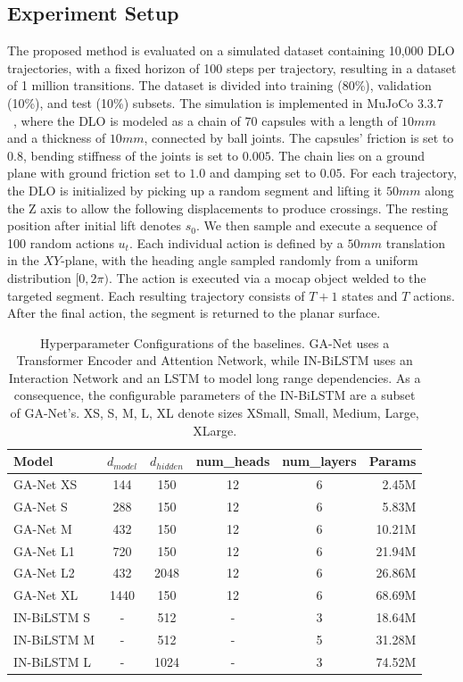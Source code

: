 \documentclass[letterpaper, 10 pt, conference]{ieeeconf}  %
\begin{document}
\subsection{Experiment Setup}

The proposed method is evaluated on a simulated dataset containing 10,000 DLO trajectories, with a fixed horizon of 100 steps per trajectory, resulting in a dataset of 1 million transitions. The dataset is divided into training (80\%), validation (10\%), and test (10\%) subsets. The simulation is implemented in MuJoCo 3.3.7 ~\cite{todorov_mujoco_2012}, where the DLO is modeled as a chain of 70 capsules with a length of $10mm$ and a thickness of $10mm$, connected by ball joints. The capsules' friction is set to $0.8$, bending stiffness of the joints is set to $0.005$. The chain lies on a ground plane with ground friction set to $1.0$ and damping set to $0.05$. For each trajectory, the DLO is initialized by picking up a random segment and lifting it $50mm$ along the Z axis to allow the following displacements to produce crossings. The resting position after initial lift denotes $s_0$. We then sample and execute a sequence of 100 random actions $u_t$. Each individual action is defined by a $50mm$ translation in the $XY$-plane, with the heading angle sampled randomly from a uniform distribution $[0, 2\pi)$. The action is executed via a mocap object welded to the targeted segment. Each resulting trajectory consists of $T+1$ states and $T$ actions. After the final action, the segment is returned to the planar surface. 


\begin{table}[t]
\centering
\caption{Hyperparameter Configurations of the baselines. GA-Net uses a Transformer Encoder and Attention Network, while IN-BiLSTM uses an Interaction Network and an LSTM to model long range dependencies. As a consequence, the configurable parameters of the IN-BiLSTM are a subset of GA-Net's. XS, S, M, L, XL denote sizes XSmall, Small, Medium, Large, XLarge.}
\label{tab:model_sizes_ganet}
\setlength{\tabcolsep}{3pt} 
\begin{tabular}{l c c c c r}
\toprule
\textbf{Model} & $d_{model}$ & $d_{hidden}$ & num\_heads & num\_layers & \textbf{Params} \\
\midrule
GA-Net XS & 144 & 150 & 12 & 6 & 2.45M \\
GA-Net S & 288 & 150 & 12 & 6 & 5.83M \\
GA-Net M & 432 & 150 & 12 & 6 & 10.21M \\
GA-Net L1 & 720 & 150 & 12 & 6 & 21.94M \\
GA-Net L2 & 432 & 2048 & 12 & 6 & 26.86M \\
GA-Net XL & 1440 & 150 & 12 & 6 & 68.69M\\
\midrule
IN-BiLSTM S & - & 512 & - & 3 & 18.64M \\
IN-BiLSTM M & - & 512 & - & 5 & 31.28M \\
IN-BiLSTM L & - & 1024 & - & 3 & 74.52M  \\
\bottomrule
\end{tabular}
\vspace{-0.5cm}
\end{table}
\end{document}
